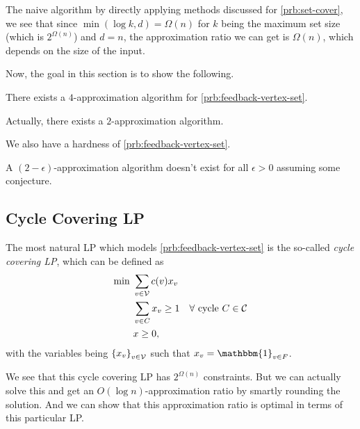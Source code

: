 \begin{note}
	The naive algorithm by directly applying methods discussed for \autoref{prb:set-cover}, we see that since \(\min (\log k, d) = \Omega (n)\) for \(k\) being the maximum set size (which is \(2^{\Omega (n)}\)) and \(d = n\), the approximation ratio we can get is \(\Omega (n)\), which depends on the size of the input.
\end{note}

Now, the goal in this section is to show the following.
\begin{theorem}\label{thm:lec4-1}
	There exists a \(4\)-approximation algorithm for \autoref{prb:feedback-vertex-set}.
\end{theorem}

\begin{remark}
	Actually, there exists a \(2\)-approximation algorithm.
\end{remark}

We also have a hardness of \autoref{prb:feedback-vertex-set}.
\begin{theorem}
	A \((2 - \epsilon )\)-approximation algorithm doesn't exist for all \(\epsilon > 0\) assuming some conjecture.
\end{theorem}

\subsection{Cycle Covering LP}
The most natural LP which models \autoref{prb:feedback-vertex-set} is the so-called \emph{cycle covering LP}, which can be defined as
\begin{align*}
	\min~ & \sum_{v\in \mathcal{\MakeUppercase{V}} } c(v) x_v                                                               \\
	      & \sum_{v\in C} x_v \geq 1                         \quad \forall \text{ cycle } C \in \mathcal{\MakeUppercase{C}} \\
	      & x \geq 0,
\end{align*}
with the variables being \(\left\{ x_v \right\} _{v\in \mathcal{\MakeUppercase{v}} }\) such that \(x_{v} = \mathbbm{1}_{v\in F}\).

\begin{remark}
	We see that this cycle covering LP has \(2^{\Omega (n)}\) constraints. But we can actually solve this and get an \(O(\log n)\)-approximation ratio by smartly rounding the solution. And we can show that this approximation ratio is optimal in terms of this particular LP.
\end{remark}

